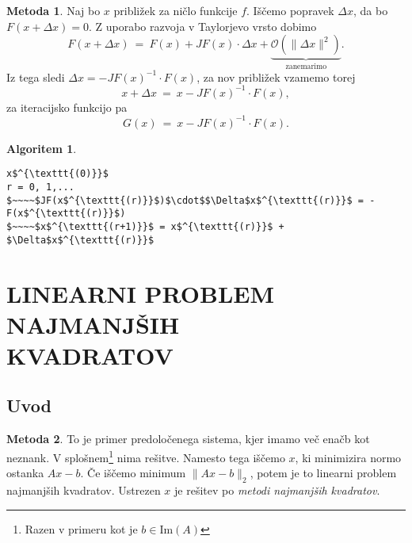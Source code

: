 \documentclass[11pt]{article}
\theoremstyle{definition}
\newtheorem*{algoritem}{Algoritem}
\newtheorem*{metoda}{Metoda}
\begin{document}
\begin{metoda}

Naj bo $x$ približek za ničlo funkcije $f$. Iščemo popravek $\Delta x$, da bo $F(x + \Delta x) = 0$. Z uporabo razvoja v Taylorjevo vrsto dobimo
$$F(x + \Delta x) ~=~ F(x) + JF(x) \cdot \Delta x + \underbrace{\mathcal{O}(\|\Delta x\| ^2)}_{\text{zanemarimo}}.$$
Iz tega sledi $\Delta x = -JF(x)^{-1} \cdot F(x)$, za nov približek vzamemo torej
$$x + \Delta x ~=~ x - JF(x)^{-1} \cdot F(x),$$
za iteracijsko funkcijo pa 
$$G(x) ~=~ x - JF(x)^{-1} \cdot F(x).$$

\end{metoda}
\vspace{0.5cm}

\begin{algoritem}
~
\begin{lstlisting}
x$^{\texttt{(0)}}$
r = 0, 1,...
$~~~~$JF(x$^{\texttt{(r)}}$)$\cdot$$\Delta$x$^{\texttt{(r)}}$ = -F(x$^{\texttt{(r)}}$)
$~~~~$x$^{\texttt{(r+1)}}$ = x$^{\texttt{(r)}}$ + $\Delta$x$^{\texttt{(r)}}$
\end{lstlisting}
\end{algoritem}
\vspace{0.5cm}


\pagebreak


\section{LINEARNI PROBLEM NAJMANJŠIH \\ KVADRATOV}
\vspace{0.5cm}


\subsection{Uvod}
\vspace{0.5cm}

\begin{metoda}

To je primer predoločenega sistema, kjer imamo več enačb kot neznank. V splošnem\footnote{Razen v primeru kot je $b \in \text{Im}(A)$} nima rešitve. Namesto tega iščemo $x$, ki minimizira normo ostanka $Ax-b$. Če iščemo minimum $\|Ax-b\|_2$, potem je to linearni problem najmanjših kvadratov. Ustrezen $x$ je rešitev po \textit{metodi najmanjših kvadratov}.

\end{metoda}
\vspace{0.5cm}
\end{document}
